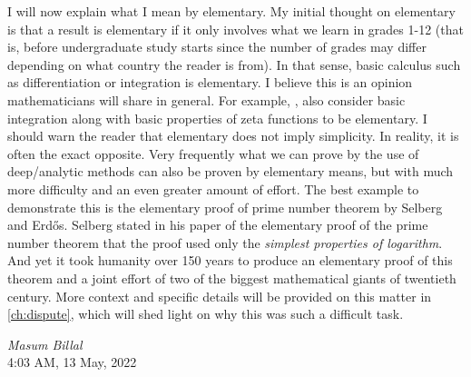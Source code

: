 \documentclass[12pt,leqno,]{book}
\theoremstyle{definition}
\theoremstyle{definition}
\begin{document}
	I will now explain what I mean by elementary. My initial thought on elementary is that a result is elementary if it only involves what we learn in grades 1-12 (that is, before undergraduate study starts since the number of grades may differ depending on what country the reader is from). In that sense, basic calculus such as differentiation or integration is elementary. I believe this is an opinion mathematicians will share in general. For example, \textcite{landau_1969}, \textcite{ingham_1932} also consider basic integration along with basic properties of zeta functions to be elementary. I should warn the reader that elementary does not imply simplicity. In reality, it is often the exact opposite. Very frequently what we can prove by the use of deep/analytic methods can also be proven by elementary means, but with much more difficulty and an even greater amount of effort. The best example to demonstrate this is the elementary proof of prime number theorem by Selberg and Erd\H{o}s. Selberg stated in his paper of the elementary proof of the prime number theorem that the proof used only the \textit{simplest properties of logarithm}. And yet it took humanity over 150 years to produce an elementary proof of this theorem and a joint effort of two of the biggest mathematical giants of twentieth century. More context and specific details will be provided on this matter in \autoref{ch:dispute},  which will shed light on why this was such a difficult task.
	\begin{flushright}
		{\itshape Masum Billal}\\
		4:03 AM, 13 May, 2022
	\end{flushright}
\end{document}
